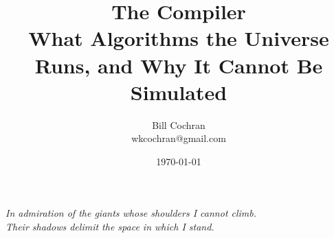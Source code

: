 \documentclass[12pt,oneside]{book}
\begin{document}
\title{The Compiler\\
\large What Algorithms the Universe Runs, and Why It Cannot Be Simulated}

\author{Bill Cochran\\wkcochran@gmail.com}
\date{\today}

\maketitle

\begin{center}
\vspace*{2em}
\textit{In admiration of the giants whose shoulders I cannot climb. \\
Their shadows delimit the space in which I stand.}
\vspace*{6em}
\end{center}

\newpage
\frontmatter
\onehalfspacing


\tableofcontents


\mainmatter











\cleardoublepage

\backmatter

\nocite{davey2002}


\end{document}
